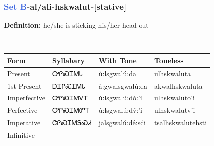 \subsubsection*{\textcolor{RoyalBlue}{Set B}{-}al/ali{-}\textbf{hskwalut}{-}[stative]}
\nopagebreak
\textbf{Definition: } he/she is sticking his/her head out
\\[0.5em]
\begin{tabularx}{\textwidth}{l X X X}%
\toprule%
\textbf{Form}&\textbf{Syllabary}&\textbf{With Tone}&\textbf{Toneless}\\%
\midrule%
Present&ᎤᎵᏍᏆᎷᏓ&ù:lsgwalú:da&ulhskwaluta\\%
1st Present&ᎠᏆᎵᏍᏆᎷᏓ&à:gwalsgwalú:da&akwalhskwaluta\\%
Imperfective&ᎤᎵᏍᏆᎷᏙᎢ&ù:lsgwalú:dó:’i&ulhskwaluto'i\\%
Perfective&ᎤᎵᏍᏆᎷᏛᎢ&ù:lsgwalú:dv̌:’i&ulhskwalutv'i\\%
Imperative&ᏣᎵᏍᏆᎷᏕᏍᏗ&jalsgwalú:dé:sdi&tsalhskwalutehsti\\%
Infinitive&{-}{-}{-}&{-}{-}{-}&{-}{-}{-}\\%
\bottomrule%
\end{tabularx}
\\[1em]